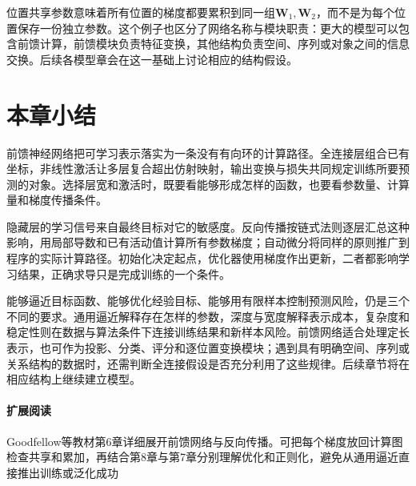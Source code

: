 位置共享参数意味着所有位置的梯度都要累积到同一组$\bm{W}_1,\bm{W}_2$，而不是为每个位置保存一份独立参数。这个例子也区分了网络名称与模块职责：更大的模型可以包含前馈计算，前馈模块负责特征变换，其他结构负责空间、序列或对象之间的信息交换。后续各模型章会在这一基础上讨论相应的结构假设。

\section{本章小结}
\label{sec:ffn-summary}

前馈神经网络把可学习表示落实为一条没有有向环的计算路径。全连接层组合已有坐标，非线性激活让多层复合超出仿射映射，输出变换与损失共同规定训练所要预测的对象。选择层宽和激活时，既要看能够形成怎样的函数，也要看参数量、计算量和梯度传播条件。

隐藏层的学习信号来自最终目标对它的敏感度。反向传播按链式法则逐层汇总这种影响，用局部导数和已有活动值计算所有参数梯度；自动微分将同样的原则推广到程序的实际计算路径。初始化决定起点，优化器使用梯度作出更新，二者都影响学习结果，正确求导只是完成训练的一个条件。

能够逼近目标函数、能够优化经验目标、能够用有限样本控制预测风险，仍是三个不同的要求。通用逼近解释存在怎样的参数，深度与宽度解释表示成本，复杂度和稳定性则在数据与算法条件下连接训练结果和新样本风险。前馈网络适合处理定长表示，也可作为投影、分类、评分和逐位置变换模块；遇到具有明确空间、序列或关系结构的数据时，还需判断全连接假设是否充分利用了这些规律。后续章节将在相应结构上继续建立模型。

\paragraph{扩展阅读}
Goodfellow等教材第6章详细展开前馈网络与反向传播。可把每个梯度放回计算图检查共享和累加，再结合第8章与第7章分别理解优化和正则化，避免从通用逼近直接推出训练或泛化成功
